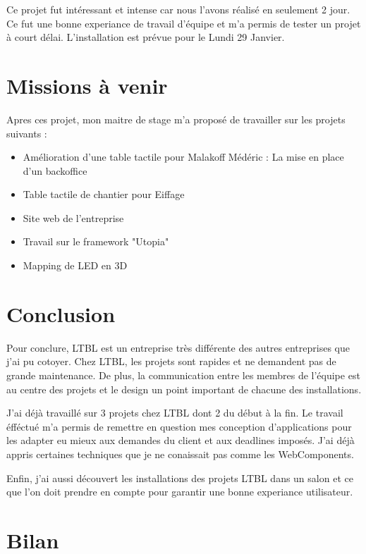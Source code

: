 \documentclass{article}
\begin{document}
Ce projet fut intéressant et intense car nous l'avons réalisé en seulement 2 jour.
Ce fut une bonne experiance de travail d'équipe et m'a permis de tester un projet à court délai.
L'installation est prévue pour le Lundi 29 Janvier.

\section{Missions à venir}

Apres ces projet, mon maitre de stage m'a proposé de travailler sur les projets suivants :

\begin{itemize}
    \item Amélioration d'une table tactile pour Malakoff Médéric : La mise en place d'un backoffice
    \item Table tactile de chantier pour Eiffage
    \item Site web de l'entreprise
    \item Travail sur le framework "Utopia"
    \item Mapping de LED en 3D
\end{itemize}

\section{Conclusion}

Pour conclure, LTBL est un entreprise très différente des autres entreprises que j'ai pu cotoyer.
Chez LTBL, les projets sont rapides et ne demandent pas de grande maintenance.
De plus, la communication entre les membres de l'équipe est au centre des projets et le design un point important de chacune des installations.

J'ai déjà travaillé sur 3 projets chez LTBL dont 2 du début à la fin.
Le travail éfféctué m'a permis de remettre en question mes conception d'applications pour les adapter eu mieux aux demandes du client et aux deadlines imposés.
J'ai déjà appris certaines techniques que je ne conaissait pas comme les WebComponents.

Enfin, j'ai aussi découvert les installations des projets LTBL dans un salon et ce que l'on doit prendre en compte pour garantir une bonne experiance utilisateur.

\section{Bilan}
\end{document}
